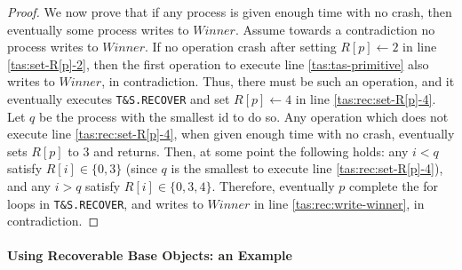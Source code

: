 \begin{proof}
	We now prove that if any process is given enough time with no crash, then eventually some process writes to $Winner$. Assume towards a contradiction no process writes to $Winner$. If no operation crash after setting $R[p] \gets 2$ in line \ref{tas:set-R[p]-2}, then the first operation to execute line \ref{tas:tas-primitive} also writes to $Winner$, in contradiction. Thus, there must be such an operation, and it eventually executes \texttt{T\&S.RECOVER} and set $R[p] \gets 4$ in line \ref{tas:rec:set-R[p]-4}. Let $q$ be the process with the smallest id to do so. Any operation which does not execute line \ref{tas:rec:set-R[p]-4}, when given enough time with no crash, eventually sets $R[p]$ to 3 and returns.
	Then, at some point the following holds: any $i < q$ satisfy $R[i] \in \{0,3\}$ (since $q$ is the smallest to execute line \ref{tas:rec:set-R[p]-4}), and any $i > q$ satisfy $R[i] \in \{0,3,4\}$. Therefore, eventually $p$ complete the for loops in \texttt{T\&S.RECOVER}, and writes to $Winner$ in line \ref{tas:rec:write-winner}, in contradiction.
	
\end{proof}




\paragraph*{Using Recoverable Base Objects: an Example}





